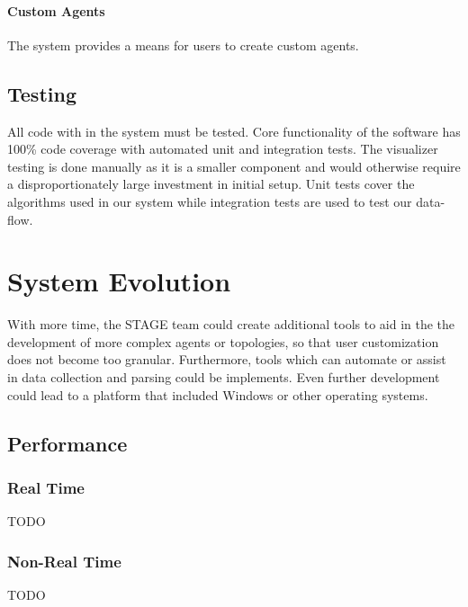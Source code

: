 \documentclass[titlepage]{article}
\begin{document}
    \paragraph{Custom Agents} The system provides a means for users to create custom agents.

\subsection{Testing%
    \label{testing}%
}
All code with in the system must be tested. Core functionality of the software has 100\% code coverage with automated unit and integration tests.  The visualizer testing is done manually as it is a smaller component and would otherwise require a disproportionately large investment in initial setup.  Unit tests cover the algorithms used in our system while integration tests are used to test our data-flow.  

\section{System Evolution}

With more time, the STAGE team could create additional tools to aid in the the development of more complex agents or topologies, so that user customization does not become too granular.  Furthermore, tools which can automate or assist in data collection and parsing could be implements.  Even further development could lead to a platform that included Windows or other operating systems.


\subsection{Performance%
    \label{performance}%
}


\subsubsection{Real Time}\label{realtime} 
TODO


\subsubsection{Non-Real Time}\label{nonrealtime}
TODO
\end{document}
